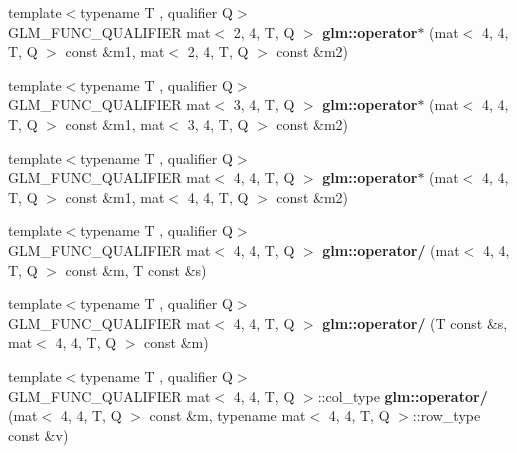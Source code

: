 \begin{DoxyCompactItemize}
\item 
\mbox{\label{type__mat4x4_8inl_a7b1b919046008866e15bf2ec344cdc90}} 
{\footnotesize template$<$typename T , qualifier Q$>$ }\\G\+L\+M\+\_\+\+F\+U\+N\+C\+\_\+\+Q\+U\+A\+L\+I\+F\+I\+ER mat$<$ 2, 4, T, Q $>$ {\bfseries glm\+::operator$\ast$} (mat$<$ 4, 4, T, Q $>$ const \&m1, mat$<$ 2, 4, T, Q $>$ const \&m2)
\item 
\mbox{\label{type__mat4x4_8inl_a840e2309b365871aecc173381ca3b770}} 
{\footnotesize template$<$typename T , qualifier Q$>$ }\\G\+L\+M\+\_\+\+F\+U\+N\+C\+\_\+\+Q\+U\+A\+L\+I\+F\+I\+ER mat$<$ 3, 4, T, Q $>$ {\bfseries glm\+::operator$\ast$} (mat$<$ 4, 4, T, Q $>$ const \&m1, mat$<$ 3, 4, T, Q $>$ const \&m2)
\item 
\mbox{\label{type__mat4x4_8inl_ad8f4287ee1fb03675fd3d6040078586d}} 
{\footnotesize template$<$typename T , qualifier Q$>$ }\\G\+L\+M\+\_\+\+F\+U\+N\+C\+\_\+\+Q\+U\+A\+L\+I\+F\+I\+ER mat$<$ 4, 4, T, Q $>$ {\bfseries glm\+::operator$\ast$} (mat$<$ 4, 4, T, Q $>$ const \&m1, mat$<$ 4, 4, T, Q $>$ const \&m2)
\item 
\mbox{\label{type__mat4x4_8inl_af9a49fff03e1135c8a4e7736ef113e9e}} 
{\footnotesize template$<$typename T , qualifier Q$>$ }\\G\+L\+M\+\_\+\+F\+U\+N\+C\+\_\+\+Q\+U\+A\+L\+I\+F\+I\+ER mat$<$ 4, 4, T, Q $>$ {\bfseries glm\+::operator/} (mat$<$ 4, 4, T, Q $>$ const \&m, T const \&s)
\item 
\mbox{\label{type__mat4x4_8inl_a584714fe13d716d288b5825f55cb9bc4}} 
{\footnotesize template$<$typename T , qualifier Q$>$ }\\G\+L\+M\+\_\+\+F\+U\+N\+C\+\_\+\+Q\+U\+A\+L\+I\+F\+I\+ER mat$<$ 4, 4, T, Q $>$ {\bfseries glm\+::operator/} (T const \&s, mat$<$ 4, 4, T, Q $>$ const \&m)
\item 
\mbox{\label{type__mat4x4_8inl_add94ecd5b862f66e257ddbbf0baf75d2}} 
{\footnotesize template$<$typename T , qualifier Q$>$ }\\G\+L\+M\+\_\+\+F\+U\+N\+C\+\_\+\+Q\+U\+A\+L\+I\+F\+I\+ER mat$<$ 4, 4, T, Q $>$\+::col\+\_\+type {\bfseries glm\+::operator/} (mat$<$ 4, 4, T, Q $>$ const \&m, typename mat$<$ 4, 4, T, Q $>$\+::row\+\_\+type const \&v)

\end{DoxyCompactItemize}
